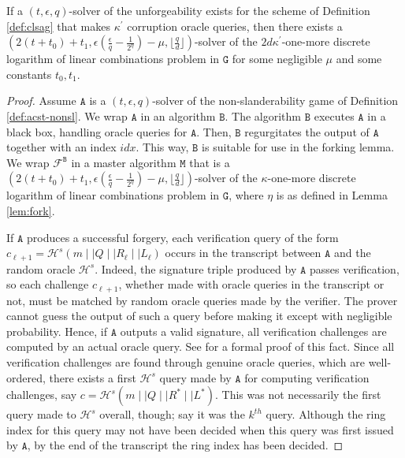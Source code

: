 \documentclass{llncs}
\newcommand{\A}{\texttt{A}}
\newcommand{\B}{\texttt{B}}
\newcommand{\G}{\texttt{G}}
\newcommand{\Hs}{\mathcal{H}^s}
\begin{document}
\begin{theorem} \label{thm:nonsl}
If a $(t, \epsilon, q)$-solver of the unforgeability exists for the scheme of Definition \ref{def:clsag} that makes $\kappa^\prime$ corruption oracle queries, then there exists a $(2(t+t_0) + t_1, \epsilon\left(\frac{\epsilon}{q} - \frac{1}{2^\eta}\right) - \mu, \lfloor \frac{q}{d}\rfloor)$-solver of the $2d\kappa^\prime$-one-more discrete logarithm of linear combinations problem in $\G$ for some negligible $\mu$ and some constants $t_0, t_1$.
\end{theorem}

\begin{proof}
Assume $\A$ is a $(t, \epsilon, q)$-solver of the non-slanderability game of Definition \ref{def:acst-nonsl}. We wrap $\A$ in an algorithm $\B$. The algorithm $\B$ executes $\A$ in a black box, handling oracle queries for $\A$. Then, $\B$ regurgitates the output of $\A$ together with an index $idx$. This way, $\B$ is suitable for use in the forking lemma. We wrap $\mathcal{F}^{\B}$ in a master algorithm $\texttt{M}$ that is a $(2(t+t_0) + t_1, \epsilon\left(\frac{\epsilon}{q} - \frac{1}{2^\eta}\right) - \mu, \lfloor \frac{q}{d}\rfloor)$-solver of the $\kappa$-one-more discrete logarithm of linear combinations problem in $\G$, where $\eta$ is as defined in Lemma \ref{lem:fork}.

If $\A$ produces a successful forgery, each verification query of the form $c_{\ell+1} = \Hs(m \mid \mid Q \mid \mid R_\ell \mid \mid L_\ell)$ occurs in the transcript between $\A$ and the random oracle $\Hs$. Indeed, the signature triple produced by $\A$ passes verification, so each challenge $c_{\ell+1}$, whether made with oracle queries in the transcript or not, must be matched by random oracle queries made by the verifier. The prover cannot guess the output of such a query before making it except with negligible probability. Hence, if $\A$ outputs a valid signature, all verification challenges are computed by an actual oracle query. See \cite{liu2004linkable} for a formal proof of this fact. Since all verification challenges are found through genuine oracle queries, which are well-ordered, there exists a first $\Hs$ query made by $\A$ for computing verification challenges, say $c = \Hs(m \mid \mid Q \mid \mid R^* \mid \mid L^*)$. This was not necessarily the first query made to $\Hs$ overall, though; say it was the $k^{th}$ query. Although the ring index for this query may not have been decided when this query was first issued by $\A$, by the end of the transcript the ring index has been decided.


\end{proof}
\end{document}
